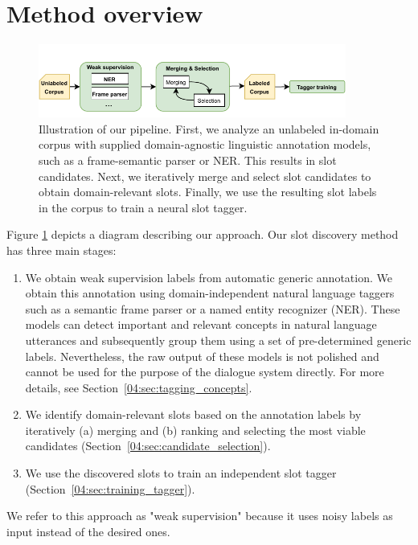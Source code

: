 \section{Method overview}
\label{04:sec:overview}
\begin{figure}[h]
    \centering
    \includegraphics[width=0.9\textwidth]{images/weakly-supervised.pdf}
    \caption{Illustration of our pipeline. First, we analyze an unlabeled in-domain corpus with supplied domain-agnostic linguistic annotation models, such as a frame-semantic parser or NER. This results in slot candidates. Next, we iteratively merge and select slot candidates to obtain domain-relevant slots. Finally, we use the resulting slot labels in the corpus to train a neural slot tagger.}
    \label{fig:discover_overall}
\end{figure}
Figure \ref{fig:discover_overall} depicts a diagram describing our approach.
Our slot discovery method has three main stages:
\begin{enumerate}
    \item We obtain weak supervision labels from automatic generic annotation.
    We obtain this annotation using domain-independent natural language taggers such as a semantic frame parser or a named entity recognizer (NER).
    These models can detect important and relevant concepts in natural language utterances and subsequently group them using a set of pre-determined generic labels.
    Nevertheless, the raw output of these models is not polished and cannot be used for the purpose of the dialogue system directly.
    For more details, see Section~\ref{04:sec:tagging_concepts}.
    \item We identify domain-relevant slots based on the annotation labels by iteratively (a) merging and (b) ranking and selecting the most viable candidates (Section~\ref{04:sec:candidate_selection}).
    
    \item We use the discovered slots to train an independent slot tagger (Section~\ref{04:sec:training_tagger}).
\end{enumerate}

We refer to this approach as "weak supervision" because it uses noisy labels as input instead of the desired ones.

